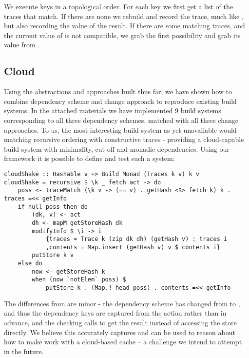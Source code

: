 We execute keys in a topological order. For each key we first get a list of the traces that match. If there are none we rebuild and record the trace, much like \Shake, but also recording the value of the result. If there are some matching traces, and the current value of  is not compatible, we grab the first possibility and grab its value from .

\subsection{Cloud \Shake}\label{sec-implementation-cloud-shake}


Using the abstractions and approaches built thus far, we have shown how to combine dependency scheme and change approach to reproduce existing build systems. In the attached materials we have implemented 9 build systems corresponding to all three dependency schemes, matched with all three change approaches. To us, the most interesting build system as yet unavailable would matching recursive ordering with constructive traces - providing a cloud-capable build system with minimality, cut-off and monadic dependencies. Using our framework it is possible to define and test such a system:

\begin{verbatim}
cloudShake :: Hashable v => Build Monad (Traces k v) k v
cloudShake = recursive $ \k _ fetch act -> do
    poss <- traceMatch (\k v -> (== v) . getHash <$> fetch k) k . traces =<< getInfo
    if null poss then do
        (dk, v) <- act
        dh <- mapM getStoreHash dk
        modifyInfo $ \i -> i
            {traces = Trace k (zip dk dh) (getHash v) : traces i
            ,contents = Map.insert (getHash v) v $ contents i}
        putStore k v
    else do
        now <- getStoreHash k
        when (now `notElem` poss) $
            putStore k . (Map.! head poss) . contents =<< getInfo
\end{verbatim}

The differences from  are minor - the dependency scheme has changed from  to , and thus the dependency keys  are captured from the action rather than in advance, and the checking calls  to get the result instead of accessing the store directly. We believe this accurately captures and can be used to reason about how to make \Shake work with a cloud-based cache -- a challenge we intend to attempt in the future.

